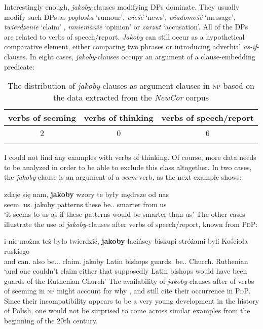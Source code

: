 \documentclass[output=paper
,modfonts
,nonflat]{langsci/langscibook}
\begin{document}
\noindent  Interestingly enough, \emph{jakoby}-clauses modifying DPs dominate. They usually modify such DPs as \emph{pogłoska} `rumour', \emph{wieść} `news', \emph{wiadomość} `message', \emph{twierdzenie} `claim' , \emph{mniemanie} `opinion' or \emph{zarzut} `accusation'. All of the DPs are related to verbs of speech\slash report. \emph{Jakoby} can still occur as a hypothetical comparative element, either comparing two phrases or introducing adverbial \emph{as-if}-clauses. In eight cases, \emph{jakoby}-clauses occupy an argument of a clause-embedding predicate:       

 \begin{table}[h]  \begin{tabular}{ccc} 
\lsptoprule
verbs of seeming & verbs of thinking & verbs of speech\slash report \\
\midrule
2 & 0 & 6  \\
\lspbottomrule
\end{tabular}
\caption{The distribution of \emph{jakoby}-clauses as argument clauses in \textsc{np} based on the data extracted from the \emph{NewCor} corpus} \label{staropolski_nowopolski_argument}
\end{table}

\noindent  I could not find any examples with verbs of thinking. Of course, more data needs to be analyzed in order to be able to exclude this class altogether. In two cases, the \emph{jakoby}-clause is an argument of a \emph{seem}-verb, as the next example shows:

\ea \gll zdaje się nam, \textbf{jakoby} wzory te były mędrsze od nas \\
		seem.{\thirdperson}{\sg} {} us.{\dat} jakoby	patterns these be.{\lptcp}.{\nvir} smarter from us \\
\glt	`it seems to us as if these patterns would be smarter than us'  
\z
The other cases illustrate the use of \emph{jakoby}-clauses after verbs of speech\slash report, known from \textsc{PdP}:

\ea \gll i nie można też było twierdzić, \textbf{jakoby} łacińscy biskupi stróżami byli Kościoła ruskiego \\
		and {\negation} can.{\pred} also be.{\lptcp}.{\sg}.{\n} claim.{\infv} jakoby Latin bishops guards.{\ins} be.{\lptcp}.{\vir} Church.{\gen} Ruthenian \\
\glt	`and one couldn't claim either that supposedly Latin bishops would have been guards of the Ruthenian Church' 
\z
The availability of \emph{jakoby}-clauses after of verbs of seeming in \textsc{np} might account for why \textcite{ojasiewicz1992}, \textcite{Wiemer2005} and \textcite{Taborek2008} still cite their occurrence in \textsc{PdP}. Since their incompatibility appears to be a very young development in the history of Polish, one would not be surprised to come across similar examples from the beginning of the 20th century. 
\end{document}
